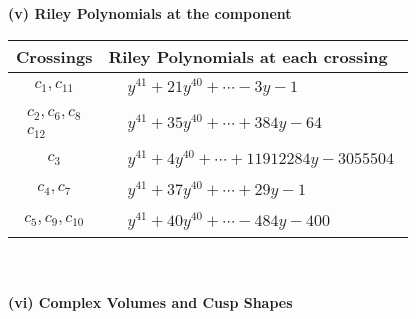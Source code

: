 \documentclass[1p]{elsarticle_modified}
\theoremstyle{definition}
\begin{document}
\newpage\renewcommand{\arraystretch}{1}
\flushleft \textbf{(v) Riley Polynomials at the component}\newline \\
\begin{tabular}{m{50pt}|m{274pt}}
Crossings & \hspace{64pt}Riley Polynomials at each crossing \\
\hline $$\begin{aligned}c_{1},c_{11}\end{aligned}$$&$\begin{aligned}
&y^{41}+21 y^{40}+\cdots-3 y-1
\end{aligned}$\\
\hline $$\begin{aligned}c_{2},c_{6},c_{8}\\c_{12}\end{aligned}$$&$\begin{aligned}
&y^{41}+35 y^{40}+\cdots+384 y-64
\end{aligned}$\\
\hline $$\begin{aligned}c_{3}\end{aligned}$$&$\begin{aligned}
&y^{41}+4 y^{40}+\cdots+11912284 y-3055504
\end{aligned}$\\
\hline $$\begin{aligned}c_{4},c_{7}\end{aligned}$$&$\begin{aligned}
&y^{41}+37 y^{40}+\cdots+29 y-1
\end{aligned}$\\
\hline $$\begin{aligned}c_{5},c_{9},c_{10}\end{aligned}$$&$\begin{aligned}
&y^{41}+40 y^{40}+\cdots-484 y-400
\end{aligned}$\\
\hline
\end{tabular}\\~\\
\newpage\flushleft \textbf{(vi) Complex Volumes and Cusp Shapes}
\end{document}
